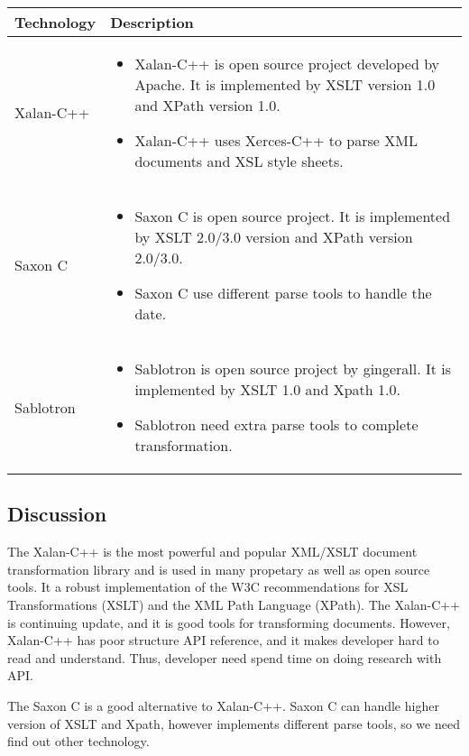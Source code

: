 \begin{center}
    \begin{tabular}{ | l | p{10cm} |}
    \hline
    Technology & Description  \\ \hline
    Xalan-C++ \cite{xalan} &
    \begin{itemize}
      \item Xalan-C++ is open source project developed by Apache. It is implemented by XSLT version 1.0 and XPath version 1.0.
      \item Xalan-C++ uses Xerces-C++ to parse XML documents and XSL style sheets.
    \end{itemize}\\ \hline
    Saxon C \cite{Saxon_c} &
    \begin{itemize}
      \item Saxon C is open source project. It is implemented by XSLT 2.0/3.0 version and XPath version 2.0/3.0.
      \item Saxon C use different parse tools to handle the date.
    \end{itemize}\\ \hline
    Sablotron \cite{Sablotron_intro} &
    \begin{itemize}
      \item Sablotron is open source project by gingerall. It is implemented by XSLT 1.0 and Xpath 1.0.
	  \item Sablotron need extra parse tools to complete transformation.
    \end{itemize}\\ \hline
    \end{tabular}
\end{center}

\subsection{Discussion}

The Xalan-C++ is the most powerful and popular XML/XSLT document transformation library and is used in many propetary as well as open source tools.
It a robust implementation of the W3C recommendations for XSL Transformations (XSLT) and the XML Path Language (XPath).
The Xalan-C++ is continuing update, and it is good tools for transforming documents.
However, Xalan-C++ has poor structure API reference, and it makes developer hard to read and understand.
Thus, developer need spend time on doing research with API.

The Saxon C is a good alternative to Xalan-C++.
Saxon C can handle higher version of XSLT and Xpath, however implements different parse tools, so we need find out other technology.

